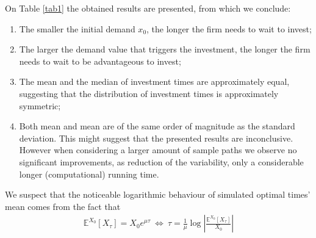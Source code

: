 On Table \ref{tab1}
the obtained results are presented, from which we conclude:
\begin{enumerate}
	\item The smaller the initial demand $x_0$, the longer the firm needs to wait to invest;
	\item The larger the demand value that triggers the investment, the longer the firm needs to wait to be advantageous to invest;
	\item The mean and the median of investment times are approximately equal, suggesting that the distribution of investment times is approximately symmetric;
	\item Both mean and mean are of the same order of magnitude as the standard deviation. This might suggest that the presented results are inconclusive. However when considering a larger amount of sample paths we observe no significant improvements, as reduction of the variability, only a considerable longer (computational) running time.
\end{enumerate}






We suspect that the noticeable logarithmic behaviour of simulated optimal times' mean comes from the fact that
\begin{align*}
\mathds{E}^{X_0}[X_\tau]=X_0 e^{\mu \tau} \ \Leftrightarrow \ \tau= \frac{1}{\mu} \log \left|  \frac{\mathds{E}^{X_0}[X_\tau]}{X_0} \right|
\end{align*}

